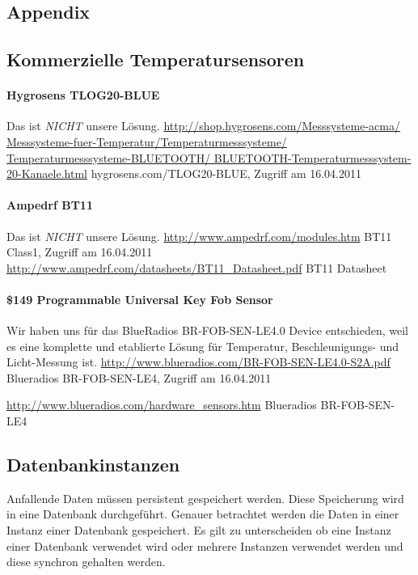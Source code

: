 \begin{appendix}
\section{Appendix}
\label{sec:appendix}

\subsection{Kommerzielle Temperatursensoren}
	\paragraph{Hygrosens TLOG20-BLUE}
		Das ist \textit{NICHT} unsere Lösung.
		\url{http://shop.hygrosens.com/Messsysteme-acma/
			Messsysteme-fuer-Temperatur/Temperaturmesssysteme/
			Temperaturmesssysteme-BLUETOOTH/
			BLUETOOTH-Temperaturmesssystem-20-Kanaele.html}
			{hygrosens.com/TLOG20-BLUE, Zugriff am 16.04.2011}
	\par
	
	\paragraph{Ampedrf BT11}
		Das ist \textit{NICHT} unsere Lösung.
		\url{http://www.ampedrf.com/modules.htm}
		{BT11 Class1, Zugriff am 16.04.2011}
		\url{http://www.ampedrf.com/datasheets/BT11_Datasheet.pdf}
		{BT11 Datasheet}
	\par 

	\paragraph{\$149 Programmable Universal Key Fob Sensor}
		Wir haben uns für das BlueRadios BR-FOB-SEN-LE4.0 Device  entschieden, weil es
		eine komplette und etablierte Lösung für Temperatur, Beschleunigungs- und
		Licht-Messung ist.
		\url{http://www.blueradios.com/BR-FOB-SEN-LE4.0-S2A.pdf}
		{Blueradios BR-FOB-SEN-LE4, Zugriff am 16.04.2011}
		
		\url{http://www.blueradios.com/hardware_sensors.htm}
		{Blueradios BR-FOB-SEN-LE4}
	\par






\subsection{Datenbankinstanzen}
	Anfallende Daten müssen persistent gespeichert werden. Diese Speicherung wird in eine Datenbank durchgeführt. Genauer betrachtet werden die Daten in einer Instanz einer Datenbank gespeichert. Es gilt zu unterscheiden ob eine Instanz einer Datenbank verwendet wird oder mehrere Instanzen verwendet werden und diese synchron gehalten werden.


\end{appendix}

